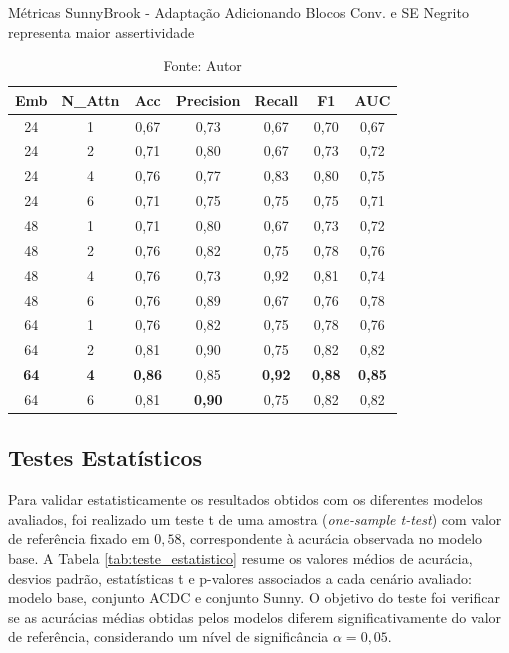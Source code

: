 \begin{table}[htbp]
\centering
\caption{Métricas SunnyBrook - Adaptação Adicionando Blocos Conv. e SE
\newline Negrito representa maior assertividade}
\begin{tabular}{ccccccc}
\toprule
\textbf{Emb} & \textbf{N\_Attn} & \textbf{Acc} & \textbf{Precision} & \textbf{Recall} & \textbf{F1} & \textbf{AUC} \\
\midrule
24 & 1 & 0,67 & 0,73 & 0,67 & 0,70 & 0,67 \\
24 & 2 & 0,71 & 0,80 & 0,67 & 0,73 & 0,72 \\
24 & 4 & 0,76 & 0,77 & 0,83 & 0,80 & 0,75 \\
24 & 6 & 0,71 & 0,75 & 0,75 & 0,75 & 0,71 \\
48 & 1 & 0,71 & 0,80 & 0,67 & 0,73 & 0,72 \\
48 & 2 & 0,76 & 0,82 & 0,75 & 0,78 & 0,76 \\
48 & 4 & 0,76 & 0,73 & 0,92 & 0,81 & 0,74 \\
48 & 6 & 0,76 & 0,89 & 0,67 & 0,76 & 0,78 \\
64 & 1 & 0,76 & 0,82 & 0,75 & 0,78 & 0,76 \\
64 & 2 & 0,81 & 0,90 & 0,75 & 0,82 & 0,82 \\
\textbf{64} & \textbf{4} & \textbf{0,86} & 0,85 & \textbf{0,92} & \textbf{0,88} & \textbf{0,85} \\
64 & 6 & 0,81 & \textbf{0,90} & 0,75 & 0,82 & 0,82 \\
\bottomrule
\end{tabular}
\caption*{Fonte: Autor}
\label{tab:metrics_sunny_se}
\end{table}


\subsection{Testes Estatísticos}
\label{subsec:testes_estatisticos}

Para validar estatisticamente os resultados obtidos com os diferentes modelos avaliados, foi realizado um teste t de uma amostra (\textit{one-sample t-test}) com valor de referência fixado em $0{,}58$, correspondente à acurácia observada no modelo base. A Tabela \ref{tab:teste_estatistico} resume os valores médios de acurácia, desvios padrão, estatísticas t e p-valores associados a cada cenário avaliado: modelo base, conjunto ACDC e conjunto Sunny. O objetivo do teste foi verificar se as acurácias médias obtidas pelos modelos diferem significativamente do valor de referência, considerando um nível de significância $\alpha = 0{,}05$.

